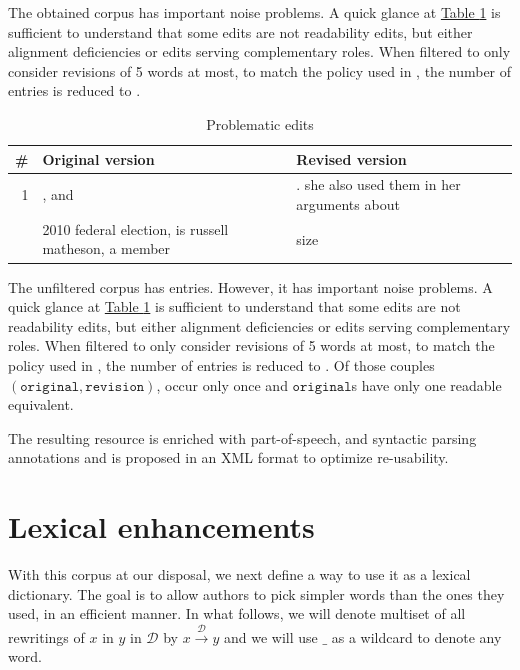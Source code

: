 \documentclass[a4paper, 11pt, onepage]{scrreprt}
\newcommand\tableref[1]{\hyperref[#1]{Table \ref*{#1}}}
\newcommand\maps[1]{\xrightarrow{\mathcal{#1}}}
\begin{document}
The obtained corpus has important noise problems. A quick glance at
\tableref{tab:problematic-edits} is sufficient to understand that some
edits are not readability edits, but either alignment deficiencies or
edits serving complementary roles. When filtered to only consider
revisions of 5 words at most, to match the policy used in
\cite{yatskar2010sake}, the number of entries is reduced to
.

\begin{table}[H]
  \centering
  \caption{Problematic edits}
  \begin{tabular}{rp{6cm}p{6cm}}
    \toprule
    \# & Original version & Revised version \\
    \midrule
    1 & , and & . she also used them in her arguments about \\
    \addlinespace
    2 & 2010 federal election, is russell matheson, a member & size\\
  \end{tabular}
  \label{tab:problematic-edits}
\end{table}

The unfiltered corpus has  entries. However, it has
important noise problems. A quick glance at
\tableref{tab:problematic-edits} is sufficient to understand that some
edits are not readability edits, but either alignment deficiencies or
edits serving complementary roles. When filtered to only consider
revisions of 5 words at most, to match the policy used in
\cite{yatskar2010sake}, the number of entries is reduced to
. Of those  couples $(\mathtt{original},
\mathtt{revision})$,  occur only once and
 $\mathtt{original}$s have only one readable
equivalent.

The resulting resource is enriched with part-of-speech, and syntactic
parsing annotations and is proposed in an XML format to optimize
re-usability.

\section{Lexical enhancements}
\label{sec:lexical-enhancements}

With this corpus at our disposal, we next define a way to use it as a
lexical dictionary. The goal is to allow authors to pick simpler words
than the ones they used, in an efficient manner. In what follows, we
will denote multiset of all rewritings of $x$ in $y$ in $\mathcal{D}$
by $x \maps{D} y$ and we will use $\_$ as a wildcard to denote any
word.
\end{document}
